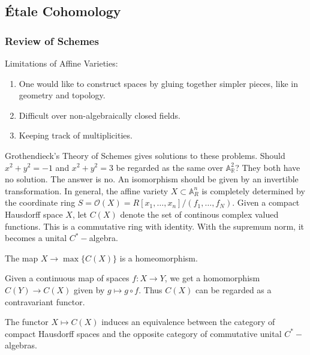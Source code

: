 \documentclass[crop=false,class=article,oneside]{standalone}
\begin{document}
    \subsection{\'{E}tale Cohomology}
        \subsubsection{Review of Schemes}
            \begin{remark}
                Limitations of Affine Varieties:
                \begin{enumerate}
                    \item One would like to construct spaces
                          by gluing together simpler pieces,
                          like in geometry and topology.
                    \item Difficult over non-algebraically
                          closed fields.
                    \item Keeping track of multiplicities.
                \end{enumerate}
            \end{remark}
            Grothendieck's Theory of Schemes gives solutions to
            these problems. Should $x^{2}+y^{2}=-1$ and
            $x^{2}+y^{2}=3$ be regarded as the same over
            $\mathbb{A}_{\mathbb{R}}^{2}$? They both have no
            solution. The answer is no. An isomorphism should
            be given by an invertible transformation. In general,
            the affine variety $X\subset\mathbb{A}_{R}^n$ is
            completely determined by the coordinate ring
            $S=\mathcal{O}(X)%
              =R[x_{1},\hdots,x_{n}]/(f_{1},\hdots,f_{N})$.
            Given a compact Hausdorff space $X$, let $C(X)$
            denote the set of continous complex valued functions.
            This is a commutative ring with identity. With the
            supremum norm, it becomes a unital $C^{*}-$algebra.
            \begin{theorem}
                The map $X\rightarrow\max\{C(X)\}$
                is a homeomorphism.
            \end{theorem}
            Given a continuous map of spaces $f:X\rightarrow Y$,
            we get a homomorphism $C(Y)\rightarrow C(X)$ given
            by $g\mapsto{g}\circ f$. Thus $C(X)$ can be
            regarded as a contravariant functor. 
            \begin{theorem}[Gelfand]
                The functor $X\mapsto C(X)$ induces an
                equivalence between the category of compact
                Hausdorff spaces and the opposite category of
                commutative unital $C^{*}-$algebras.
            \end{theorem}
\end{document}
